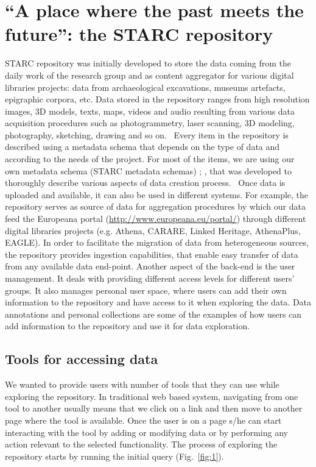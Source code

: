 \documentclass[amsthm,ebook]{saparticle}
\begin{document}
\section{``A place where the past meets the future'': the STARC repository}


\noindent STARC repository was initially developed to store the data coming from the daily work of the research group and as
content aggregator for various digital libraries projects: data from archaeological excavations, museums artefacts,
epigraphic corpora, etc. Data stored in the repository ranges from high resolution images, 3D models, texts, maps,
videos and audio resulting from various data acquisition procedures such as photogrammetry, laser scanning, 3D
modeling, photography, sketching, drawing and so on. \ Every item in the repository is described using a metadata
schema that depends on the type of data and according to the needs of the project. For most of the items, we are using
our own metadata schema (STARC metadata schemas) \citep{ronzino_metadata_2012}; \citep{vassallo_revealing_2013}, that was developed to
thoroughly describe various aspects of data creation process. \ Once data is uploaded and available, it can also be
used in different systems. For example, the repository serves as source of data for aggregation procedures by which our
data feed the Europeana portal (\url{http://www.europeana.eu/portal/}) through different digital libraries projects (e.g.
Athena, CARARE, Linked Heritage, AthenaPlus, EAGLE). In order to facilitate the migration of data from heterogeneous
sources, the repository provides ingestion capabilities, that enable easy transfer of data from any available data
end-point. Another aspect of the back-end is the user management. It deals with providing different access levels for
different users’ groups. It also manages personal user space, where users can add their own information to the
repository and have access to it when exploring the data. Data annotations and personal collections are some of the
examples of how users can add information to the repository and use it for data exploration. 




\subsection{Tools for accessing data }


\noindent We wanted to provide users with number of tools that they can use while exploring the repository. In traditional web
based system, navigating from one tool to another usually means that we click on a link and then move to another page
where the tool is available. Once the user is on a page s/he can start interacting with the tool by adding or modifying
data or by performing any action relevant to the selected functionality. The process of exploring the repository starts
by running the initial query (Fig.~\ref{fig:1}). 
\end{document}
